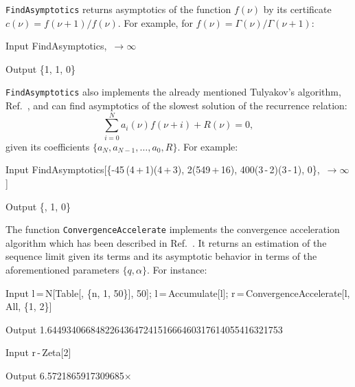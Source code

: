\documentclass[sort&compress]{elsarticle}
\begin{document}
\texttt{FindAsymptotics} returns asymptotics of the function $f(\nu)$ by its certificate $c(\nu) = f(\nu+1) / f(\nu)$.
For example, for $f(\nu) = \Gamma(\nu) / \Gamma(\nu+1)$:
\begin{mmaCell}[moredefined={FindAsymptotics}]{Input}
	FindAsymptotics\pbl{}, \mmaUnd{\(\nu\)}\,\(\to\infty\)\pbr
\end{mmaCell}
\begin{mmaCell}{Output}
	\{1, 1, 0\}
\end{mmaCell}
\texttt{FindAsymptotics} also implements the already mentioned Tulyakov's algorithm, Ref.~\cite{Tulyakov:2011}, and can find asymptotics of the slowest solution of the recurrence relation:
\begin{equation}
	\sum_{i=0}^{N} a_i(\nu) f(\nu+i) + R(\nu) = 0,
\end{equation}
given its coefficients $\{a_N, a_{N-1}, \ldots, a_0, R\}$.
For example:
\begin{mmaCell}[moredefined={FindAsymptotics}]{Input}
	FindAsymptotics[\{-45\,(4\mmaUnd{\(\nu\)}\,+\,1)(4\mmaUnd{\(\nu\)}\,+\,3), 2(549\,+\,16), 400(3\mmaUnd{\(\nu\)}\,-\,2)(3\mmaUnd{\(\nu\)}\,-\,1), 0\}, \mmaUnd{\(\nu\)}\,\(\to\infty\)]
\end{mmaCell}
\begin{mmaCell}{Output}
	\big\{, 1, 0\big\}
\end{mmaCell}

The function \texttt{ConvergenceAccelerate} implements the convergence acceleration algorithm which has been described in Ref.~\cite{LeeMingulov:2016:SummerTime}.
It returns an estimation of the sequence limit given its terms and its asymptotic behavior in terms of the aforementioned parameters $\{q, \alpha\}$.
For instance:
\begin{mmaCell}[moredefined={ConvergenceAccelerate,Accumulate}, morelocal={n}]{Input}
	l\,=\,N[Table[, \{n, 1, 50\}], 50];
	l\,=\,Accumulate[l];
	r\,=\,ConvergenceAccelerate[l, All, \{1, 2\}]
\end{mmaCell}
\begin{mmaCell}{Output}
	1.6449340668482264364724151666460317614055416321753
\end{mmaCell}
\begin{mmaCell}[moredefined={r}]{Input}
	r\,-\,Zeta[2]
\end{mmaCell}
\begin{mmaCell}{Output}
	6.5721865917309685\(\times\)
\end{mmaCell}
\end{document}
